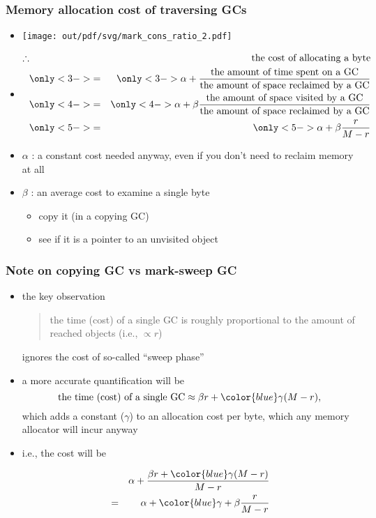 \documentclass[11pt,dvipdfmx]{beamer}
\newcommand{\ao}[1]{{\color{blue}#1}}
\begin{document}
\begin{frame}
  \frametitle{Memory allocation cost of traversing GCs}
  \begin{itemize}
  \item<1-> []
\begin{center}
\texttt{[image: out/pdf/svg/mark\_cons\_ratio\_2.pdf]}
\end{center}
\item<2-> []
  \begin{eqnarray*}
    \therefore
    & & \mbox{the cost of allocating a byte} \\
    & \only<3->{=} & \only<3->{\alpha + \frac{\mbox{the amount of time spent on a GC}}
                     {\mbox{the amount of space reclaimed by a GC}}} \\
    & \only<4->{=} & \only<4->{\alpha + \beta \frac{\mbox{the amount of space visited by a GC}}
                           {\mbox{the amount of space reclaimed by a GC}}} \\
    & \only<5->{=} & \only<5->{\alpha + \beta \frac{r}{M - r}}
  \end{eqnarray*}

  \item<3-> $\alpha$ : a constant cost needed anyway, even if you don't need to reclaim memory at all
  \item<5-> $\beta$ : an average cost to examine a single byte
    \begin{itemize}
    \item copy it (in a copying GC)
    \item see if it is a pointer to an unvisited object
    \end{itemize}
\end{itemize}
\end{frame}
\fi


\begin{frame}
  \frametitle{Note on copying GC vs mark-sweep GC}
  \begin{itemize}
  \item the key observation
    \begin{quote}
      the time (cost) of a single GC is roughly proportional to the amount of reached objects (i.e., $\propto r$)
    \end{quote}
    ignores the cost of so-called ``sweep phase''

  \item a more accurate quantification will be
    \[ \mbox{the time (cost) of a single GC}
      \approx \beta r + \ao{\gamma (M - r)}, \]
    which adds a constant ($\gamma$) to an allocation cost
    per byte, which any memory allocator will incur anyway

  \item i.e., the cost will be 

  \begin{eqnarray*}
    &   & \alpha + \frac{\beta r + \ao{\gamma (M - r)}}{M-r} \\
    & = & \alpha + \ao{\gamma} + \beta \frac{r}{M-r} \\
  \end{eqnarray*}
  
  \end{itemize}
\end{frame}
\end{document}
